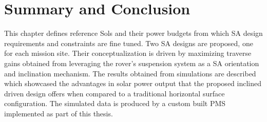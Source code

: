 \section{Summary and Conclusion}
\label{sec:Design:SummaryAndConclusion}
This chapter defines reference Sols and their power budgets from which \ac{SA} design requirements and constraints are fine tuned. Two \ac{SA} designs are proposed, one for each mission site. Their conceptualization is driven by maximizing traverse gains obtained from leveraging the rover's suspension system as a \ac{SA} orientation and inclination mechanism. The results obtained from simulations are described which showcased the advantages in solar power output that the proposed inclined driven design offers when compared to a traditional horizontal surface configuration. The simulated data is produced by a custom built \ac{PMS} implemented as part of this thesis.
